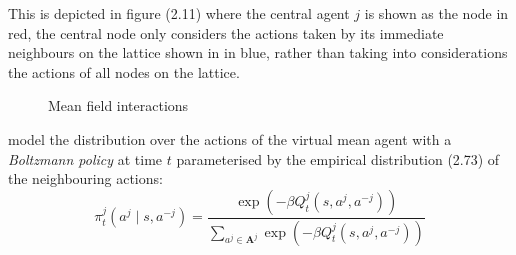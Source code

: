 This is depicted in figure (2.11) where the central agent $j$ is shown as the node in red, the central node
only considers the actions taken by its immediate neighbours on the lattice shown in in blue, rather than 
taking into considerations the actions of all nodes on the lattice.
\begin{figure}[!htb]
    \centering
        \caption{Mean field interactions}
\end{figure}
\cite{Yang2018} model the distribution over the actions of the virtual mean agent
with a \emph{Boltzmann policy} at time $t$ parameterised by the empirical distribution (2.73)
of the neighbouring actions:
\begin{equation}
    \pi^j_t(a^j \mid s, a^{-j}) =\frac{\exp(-\beta Q^j_t(s,a^j,a^{-j}))}{\sum_{a^j \in \mathbf{A}^j}\exp(-\beta Q^j_t(s,a^j,a^{-j}))}
\end{equation}

